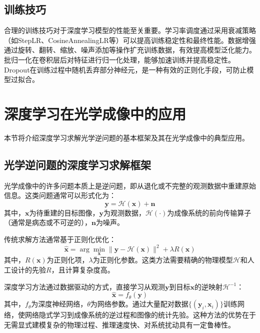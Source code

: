{\subsection{训练技巧}

合理的训练技巧对于深度学习模型的性能至关重要。学习率调度\citep{loshchilov2017sgdr}通过采用衰减策略（如StepLR、CosineAnnealingLR等）可以提高训练稳定性和最终性能。数据增强\citep{shorten2019survey}通过旋转、翻转、缩放、噪声添加等操作扩充训练数据，有效提高模型泛化能力。批归一化\citep{ioffe2015batch}在卷积层后对特征进行归一化处理，能够加速训练并提高稳定性。Dropout\citep{srivastava2014dropout}在训练过程中随机丢弃部分神经元，是一种有效的正则化手段，可防止模型过拟合。


\section{深度学习在光学成像中的应用}\label{sec:dl_imaging}

本节将介绍深度学习求解光学逆问题的基本框架及其在光学成像中的典型应用。

\subsection{光学逆问题的深度学习求解框架}

光学成像中的许多问题本质上是逆问题，即从退化或不完整的观测数据中重建原始信息\citep{ongie2020deep}。这类问题通常可以形式化为：
\begin{equation}
\mathbf{y} = \mathcal{H}(\mathbf{x}) + \mathbf{n}
\end{equation}
其中，$\mathbf{x}$为待重建的目标图像，$\mathbf{y}$为观测数据，$\mathcal{H}(\cdot)$为成像系统的前向传输算子（通常是病态或不可逆的），$\mathbf{n}$为噪声。

传统求解方法通常基于正则化优化\citep{mccann2017convolutional}：
\begin{equation}
\hat{\mathbf{x}} = \arg\min_{\mathbf{x}} \|\mathbf{y} - \mathcal{H}(\mathbf{x})\|^2 + \lambda R(\mathbf{x})
\end{equation}
其中，$R(\mathbf{x})$为正则化项，$\lambda$为正则化参数。这类方法需要精确的物理模型$\mathcal{H}$和人工设计的先验$R$，且计算复杂度高。

深度学习方法通过数据驱动的方式，直接学习从观测$\mathbf{y}$到目标$\mathbf{x}$的逆映射$\mathcal{H}^{-1}$\citep{ongie2020deep,mccann2017convolutional}：
\begin{equation}
\hat{\mathbf{x}} = f_\theta(\mathbf{y})
\end{equation}
其中，$f_\theta$为深度神经网络，$\theta$为网络参数。通过大量配对数据$\{(\mathbf{y}_i, \mathbf{x}_i)\}$训练网络，使网络隐式学习到成像系统的逆过程和图像的统计先验。这种方法的优势在于无需显式建模复杂的物理过程、推理速度快、对系统扰动具有一定鲁棒性。

}
